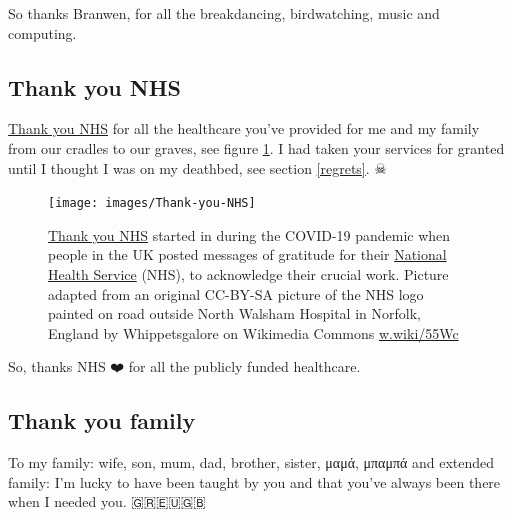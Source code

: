 \documentclass[
]{book}
\begin{document}
So thanks Branwen, for all the breakdancing, birdwatching, music and computing.

\hypertarget{thxnhs}{%
\subsection{Thank you NHS}\label{thxnhs}}

\href{https://en.wikipedia.org/wiki/Thank_You_NHS}{Thank you NHS} for all the healthcare you've provided for me and my family from our cradles to our graves, see figure \ref{fig:nhs-fig}. I had taken your services for granted until I thought I was on my deathbed, see section \ref{regrets}. ☠

\begin{figure}

{\centering \texttt{[image: images/Thank-you-NHS]} 

}

\caption{\href{https://en.wikipedia.org/wiki/Thank_You_NHS}{Thank you NHS} started in during the COVID-19 pandemic when people in the UK posted messages of gratitude for their \href{https://en.wikipedia.org/wiki/National_Health_Service}{National Health Service} (NHS), to acknowledge their crucial work. Picture adapted from an original CC-BY-SA picture of the NHS logo painted on road outside North Walsham Hospital in Norfolk, England by Whippetsgalore on Wikimedia Commons \href{https://w.wiki/55Wc}{w.wiki/55Wc}}\label{fig:nhs-fig}
\end{figure}



So, thanks NHS ❤️ for all the publicly funded healthcare. 🙏

\hypertarget{family}{%
\subsection{Thank you family}\label{family}}

To my family: wife, son, mum, dad, brother, sister, μαμά, μπαμπά and extended family: I'm lucky to have been taught by you and that you've always been there when I needed you. 🇬🇷🇪🇺🇬🇧
\end{document}

